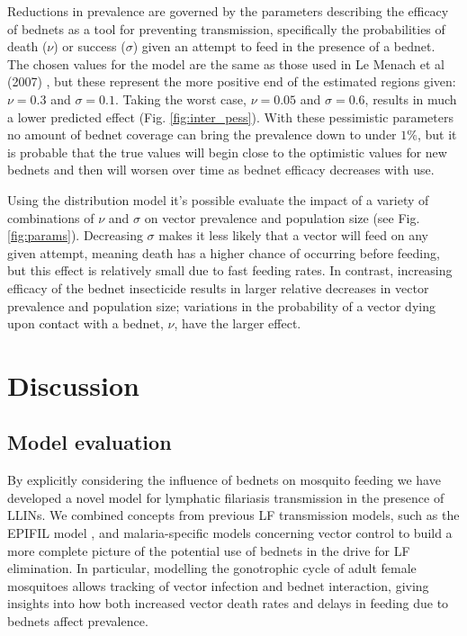 \documentclass[5p,times]{elsarticle}
\begin{document}
Reductions in prevalence are governed by the parameters describing the efficacy of bednets as a tool for preventing transmission, specifically the probabilities of death ($\nu$) or success ($\sigma$) given an attempt to feed in the presence of a bednet. The chosen values for the model are the same as those used in Le Menach et al (2007) \cite{le2007}, but these represent the more positive end of the estimated regions given: $\nu=0.3$ and $\sigma=0.1$. Taking the worst case, $\nu=0.05$ and $\sigma=0.6$, results in much a lower predicted effect (Fig. \ref{fig:inter_pess}). With these pessimistic parameters no amount of bednet coverage can bring the prevalence down to under $1\%$, but it is probable that the true values will begin close to the optimistic values for new bednets and then will worsen over time as bednet efficacy decreases with use.

Using the distribution model it's possible evaluate the impact of a variety of combinations of $\nu$ and $\sigma$ on vector prevalence and population size (see Fig. \ref{fig:params}). Decreasing $\sigma$ makes it less likely that a vector will feed on any given attempt, meaning death has a higher chance of occurring before feeding, but this effect is relatively small due to fast feeding rates. In contrast, increasing efficacy of the bednet insecticide results in larger relative decreases in vector prevalence and population size; variations in the probability of a vector dying upon contact with a bednet, $\nu$, have the larger effect.

\section{Discussion}

\subsection{Model evaluation}

By explicitly considering the influence of bednets on mosquito feeding we have developed a novel model for lymphatic filariasis transmission in the presence of LLINs. We combined concepts from previous LF transmission models, such as the EPIFIL model \cite{norman2000}, and malaria-specific models concerning vector control \cite{le2007,killeen2016} to build a more complete picture of the potential use of bednets in the drive for LF elimination. In particular, modelling the gonotrophic cycle of adult female mosquitoes allows tracking of vector infection and bednet interaction, giving insights into how both increased vector death rates and delays in feeding due to bednets affect prevalence.
\end{document}
